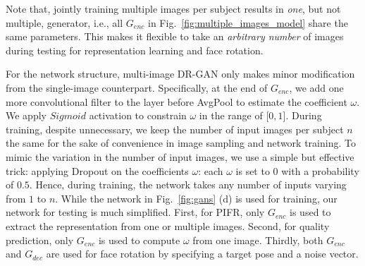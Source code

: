 \documentclass[10pt,journal,compsoc]{IEEEtran}
\begin{document}
Note that, jointly training multiple images per subject results in {\it one}, but not multiple, generator, i.e., all $G_{enc}$ in Fig.~\ref{fig:multiple_images_model} share the same parameters. 
This makes it flexible to take an {\it arbitrary number} of images during testing for representation learning and face rotation. 

For the network structure, multi-image DR-GAN only makes minor modification from the single-image counterpart.
Specifically, at the end of $G_{enc}$, we add one more convolutional filter to the layer before AvgPool to estimate the coefficient $\omega$. 
We apply $Sigmoid$ activation to constrain $\omega$ in the range of [$0,1$]. 
During training, despite unnecessary,  we keep the number of input images per subject $n$ the same for the sake of convenience in image sampling and network training.
To mimic the variation in the number of input images, we use a simple but effective trick: applying Dropout on the coefficients $\omega$: each $\omega$ is set to $0$ with a probability of $0.5$. 
Hence, during training, the network takes any number of inputs varying from $1$ to $n$. 
While the network in Fig.~\ref{fig:gans} (d) is used for training, our network for testing is much simplified. 
First, for PIFR, only $G_{enc}$ is used to extract the representation from one or multiple images. 
Second, for quality prediction, only $G_{enc}$ is used to compute $\omega$ from one image.
Thirdly, both $G_{enc}$ and $G_{dec}$ are used for face rotation by specifying a target pose and a noise vector. 
\end{document}
